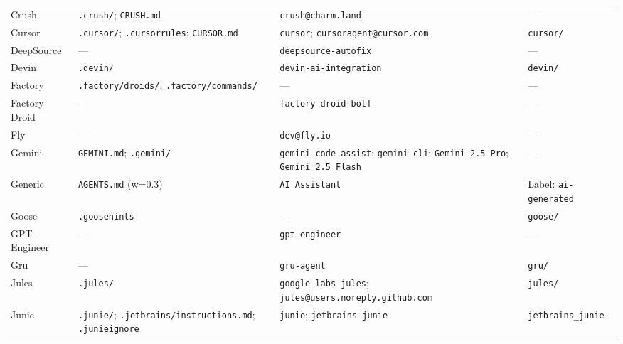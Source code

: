 \begin{small}
\begin{longtable}{@{}p{2.8cm}p{3.8cm}p{4.8cm}p{3.1cm}@{}}
Crush           & \texttt{.crush/}; \texttt{CRUSH.md}           & \texttt{crush@charm.land}                                                   & --- \\
Cursor          & \texttt{.cursor/}; \texttt{.cursorrules}; \texttt{CURSOR.md} & \texttt{cursor}; \texttt{cursoragent@cursor.com}            & \texttt{cursor/} \\
DeepSource      & ---                                           & \texttt{deepsource-autofix}                                                 & --- \\
Devin           & \texttt{.devin/}                              & \texttt{devin-ai-integration}                                               & \texttt{devin/} \\
Factory         & \texttt{.factory/droids/}; \texttt{.factory/commands/} & ---                                                                  & --- \\
Factory Droid   & ---                                           & \texttt{factory-droid[bot]}                                                 & --- \\
Fly             & ---                                           & \texttt{dev@fly.io}                                                         & --- \\
Gemini          & \texttt{GEMINI.md}; \texttt{.gemini/}         & \texttt{gemini-code-assist}; \texttt{gemini-cli}; \texttt{Gemini 2.5 Pro}; \texttt{Gemini 2.5 Flash} & --- \\
Generic         & \texttt{AGENTS.md} (w=0.3)                    & \texttt{AI Assistant}                                                       & Label: \texttt{ai-generated} \\
Goose           & \texttt{.goosehints}                          & ---                                                                         & \texttt{goose/} \\
GPT-Engineer    & ---                                           & \texttt{gpt-engineer}                                                       & --- \\
Gru             & ---                                           & \texttt{gru-agent}                                                          & \texttt{gru/} \\
Jules           & \texttt{.jules/}                              & \texttt{google-labs-jules}; \texttt{jules@users.noreply.github.com}         & \texttt{jules/} \\
Junie           & \texttt{.junie/}; \texttt{.jetbrains/instructions.md}; \texttt{.junieignore} & \texttt{junie}; \texttt{jetbrains-junie}            & \texttt{jetbrains\_junie} \\

\end{longtable}
\end{small}
